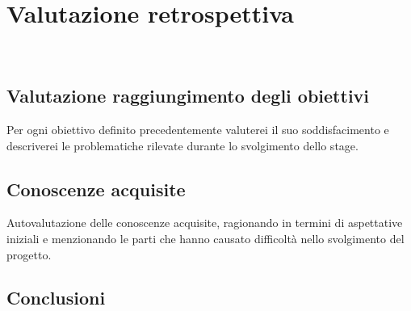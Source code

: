 
\pagebreak
\chapter{Valutazione retrospettiva}
\label{cap:analisi-requisiti}

\\



\section{Valutazione raggiungimento degli obiettivi}

Per ogni obiettivo definito precedentemente valuterei il suo soddisfacimento e descriverei le problematiche rilevate durante lo svolgimento dello stage.


\section{Conoscenze acquisite}

Autovalutazione delle conoscenze acquisite, ragionando in termini di aspettative iniziali e menzionando le parti che hanno causato difficoltà nello svolgimento del progetto.


\section{Conclusioni}


